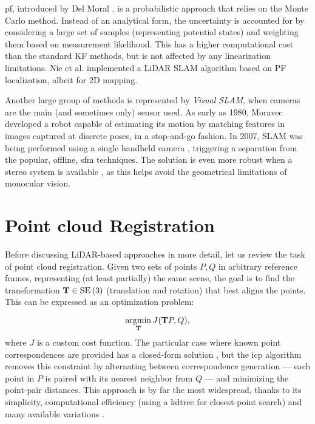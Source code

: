 \acrfull{pf}, introduced by Del Moral \cite{del1997nonlinear}, is a probabilistic approach that relies on the Monte Carlo method. Instead of an analytical form, the uncertainty is accounted for by considering a large set of samples (representing potential states) and weighting them based on measurement likelihood. This has a higher computational cost than the standard KF methods, but is not affected by any linearization limitations. Nie et al. \cite{lcpf2020} implemented a LiDAR SLAM algorithm based on PF localization, albeit for 2D mapping.

Another large group of methods is represented by \emph{Visual SLAM}, when cameras are the main (and sometimes only) sensor used. As early as 1980, Moravec \cite{moravec1980obstacle} developed a robot capable of estimating its motion by matching features in images captured at discrete poses, in a stop-and-go fashion. In 2007, SLAM was being performed using a single handheld camera \cite{davison2007monoslam,klein2007parallel}, triggering a separation from the popular, offline, \gls{sfm} techniques. The solution is even more robust when a stereo system is available \cite{mei2011rslam}, as this helps avoid the geometrical limitations of monocular vision.

\section{Point cloud Registration}

Before discussing LiDAR-based approaches in more detail, let us review the task of point cloud registration. Given two sets of points $P, Q$ in arbitrary reference frames, representing (at least partially) the same scene, the goal is to find the transformation $\mathbf{T} \in \operatorname{SE}\left(3\right) $ (translation and rotation) that best aligns the points. This can be expressed as an optimization problem:

\begin{equation}
    \underset{\mathbf{T}}{\operatorname{argmin}}\,J(\mathbf{T}P, Q)\text{,}
\end{equation}
where $J$ is a custom cost function. The particular case where known point correspondences are provided has a closed-form solution \cite{arun1987leastsquares}, but the \acrfull{icp} algorithm \cite{besl1992method} removes this constraint by alternating between correspondence generation --- each point in $P$ is paired with its nearest neighbor from $Q$ --- and minimizing the point-pair distances. This approach is by far the most widespread, thanks to its simplicity, computational efficiency (\eg using a \gls{kdtree} for closest-point search) and many available variations \cite{rusinkiewicz2001efficient,huang2021comprehensivesurveypointcloud}.

